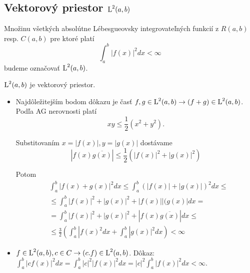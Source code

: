 
\subsection{Vektorový priestor $\mbox{L}^2(a,b)$}

\begin{definicia}
    Množinu všetkých absolútne Lébesgueovsky integrovateľných 
    funkcií z $R(a,b)$ resp. $C(a,b)$ pre ktoré platí
    \begin{equation}
        \int_a^b |f(x)|^2 dx < \infty
    \end{equation}
    budeme označovať $\mbox{L}^2(a,b)$.
\end{definicia}

\begin{lema}
    $\mbox{L}^2(a,b)$ je vektorový priestor.
    \label{lema:LLab_je_vp}
\end{lema}

\begin{dokaz}
\begin{itemize}
\item
    Najdôležitejším bodom dôkazu je časť 
    $f,g \in \mbox{L}^2(a,b) \rightarrow (f+g)\in \mbox{L}^2(a,b)$.
    Podľa AG nerovnosti platí 
    \begin{equation*}
        xy \le \frac{1}{2}(x^2 + y^2).
    \end{equation*}
    
    Substitovaním $x=|f(x)|,y=|g(x)|$ dostávame
    \begin{equation*}
        |f(x)\overline{g(x)}| \le \frac{1}{2} 
        ( |f(x)|^2 + |g(x)|^2)
    \end{equation*}
    
     Potom
    \begin{eqnarray*}
    & \int_a^b |f(x)+g(x)|^2 dx  \le
    \int_a^b (|f(x)|+|g(x)|)^2 dx \le \\    
    & \le  \int_a^b |f(x)|^2 + |g(x)|^2 + |f(x)||(g(x)| dx = \\
    & = \int_a^b |f(x)|^2 + |g(x)|^2 + |f(x) \overline{g(x)}| dx \le \\
    & \le \frac{3}{2}( \int_a^b |f(x)^2 dx + \int_a^b |g(x)|^2 dx)
    < \infty
    \end{eqnarray*}
\item
    $f \in \mbox{L}^2(a,b), c\in C \rightarrow (c.f) \in \mbox{L}^2(a,b)$.
    Dôkaz: $\int_a^b |cf(x)|^2 dx = \int_a^b |c|^2 |f(x)|^2 dx =
             |c|^2 \int_a^b |f(x)|^2 dx < \infty$.
\end{itemize}
\end{dokaz}

